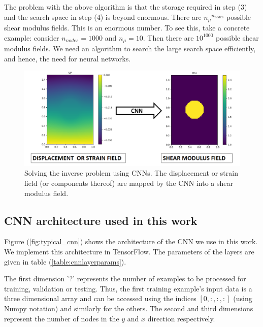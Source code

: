 \documentclass[12pt]{article}
\begin{document}
The problem with the above algorithm is that the storage required in step (3) and the search space in step (4) is beyond enormous. There are ${n_{\mu}}^{n_{nodes}}$ possible shear modulus fields. This is an enormous number. To see this, take a concrete example: consider $n_{nodes}=1000$ and $n_{\mu}=10$. Then there are $10^{1000}$ possible shear modulus fields. We need an algorithm to search the large search space efficiently, and hence, the need for neural networks.
%
\begin{figure}[h]
   \centering
    \includegraphics[totalheight=5cm]{Figures/schematic_inv/schematic_inv.png}
  \caption{\label{fig:schematic_inv} Solving the inverse problem using CNNs. The displacement or strain field (or components thereof) are mapped by the CNN into a shear modulus field.}
\end{figure}
%
\subsection{\label{sect:cnnarch} CNN architecture used in this work}
Figure (\ref{fig:typical_cnn}) shows the architecture of the CNN we use in this work. We implement this architecture in TensorFlow. The parameters of the layers are given in table (\ref{table:cnnlayerparams}).

The first dimension '?' represents the number of examples to be processed for training, validation or testing. Thus, the first training example's input data is a three dimensional array and can be accessed using the indices $[0,:,:,:]$ (using Numpy \cite{paper:numpy} notation) and similarly for the others. The second and third dimensions represent the number of nodes in the $y$ and $x$ direction respectively.
\end{document}
